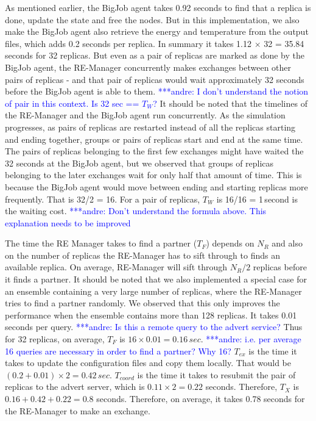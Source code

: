 \documentclass{rspublic}
\newcommand{\alnote}[1]{ {\textcolor{blue} { ***andre: #1 }}}
\newcommand{\alnote}[1]{}
\begin{document}

As mentioned earlier, the BigJob agent takes 0.92 seconds to find that
a replica is done, update the state and free the nodes. But in this
implementation, we also make the BigJob agent also retrieve the energy
and temperature from the output files, which adds 0.2 seconds per
replica. In summary it takes 1.12 $\times$ 32 = 35.84 seconds for 32
replicas. But even as a pair of replicas are marked as done by the
BigJob agent, the RE-Manager concurrently makes exchanges between
other pairs of replicas - and that pair of replicas would wait
approximately 32 seconds before the BigJob agent is able to
them. \alnote{I don't understand the notion of pair in this
  context. Is 32 sec == $T_W$?} It should be noted that the timelines
of the RE-Manager and the BigJob agent run concurrently.  As the
simulation progresses, as pairs of replicas are restarted instead of
all the replicas starting and ending together, groups or pairs of
replicas start and end at the same time. The pairs of replicas
belonging to the first few exchanges might have waited the 32 seconds
at the BigJob agent, but we observed that groups of replicas belonging
to the later exchanges wait for only half that amount of time. This is
because the BigJob agent would move between ending and starting
replicas more frequently. That is 32/2 = 16.  For a pair of replicas,
$T_W$ is 16/16 = 1\,second is the waiting cost.  \alnote{Don't
  understand the formula above. This explanation needs to be improved}

The time the RE Manager takes to find a partner ($T_F$) depends on
$N_R$ and also on the number of replicas the RE-Manager has to sift
through to finds an available replica. On average, RE-Manager will
sift through $N_R/2$ replicas before it finds a partner. %
It should be noted that we also implemented a
special case for an ensemble containing a very large number of
replicas, where the RE-Manager tries to find a partner randomly. We
observed that this only improves the performance when the ensemble
contains more than 128 replicas. It takes 0.01 seconds per
query. \alnote{Is this a remote query to the advert service?}  Thus
for 32 replicas, on average, $T_F$ is $16\times
0.01=0.16\,sec$. \alnote{i.e. per average 16 queries are necessary in
  order to find a partner? Why 16?}  $T_{ex}$ is the time it takes to
update the configuration files and copy them locally. That would be
$({0.2+0.01})\times 2=0.42\,sec.$ $T_{coord}$ is the time it takes to
resubmit the pair of replicas to the advert server, which is
$0.11\times 2 = 0.22$ seconds. Therefore, $T_{X}$ is
$0.16+0.42+0.22=0.8$ seconds. Therefore, on average, it takes 0.78
seconds for the RE-Manager to make an exchange.
\end{document}
